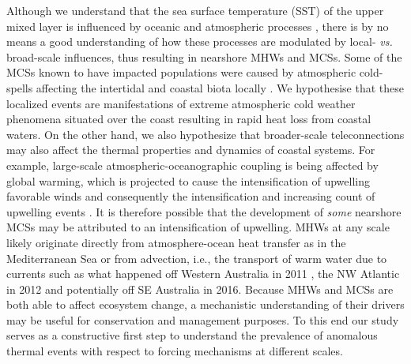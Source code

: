 \documentclass[a4paper,10pt,review]{elsarticle}
\begin{document}
Although we understand that the sea surface temperature (SST) of the upper mixed layer is influenced by oceanic and atmospheric processes \citep[see Equation 1 of][]{Deser2010}, there is by no means a good understanding of how these processes are modulated by local- \emph{vs.} broad-scale influences, thus resulting in nearshore MHWs and MCSs. Some of the MCSs known to have impacted populations were caused by atmospheric cold-spells affecting the intertidal and coastal biota locally \citep{Gunter1941, Firth2011}. We hypothesise that these localized events are manifestations of extreme atmospheric cold weather phenomena situated over the coast resulting in rapid heat loss from coastal waters. On the other hand, we also hypothesize that broader-scale teleconnections may also affect the thermal properties and dynamics of coastal systems. For example, large-scale atmospheric-oceanographic coupling is being affected by global warming, which is projected to cause the intensification of upwelling favorable winds and consequently the intensification and increasing count of upwelling events \citep[see][for a review of this and alternative hypotheses]{Garcia-Reyes2015}. It is therefore possible that the development of \emph{some} nearshore MCSs may be attributed to an intensification of upwelling. MHWs at any scale likely originate directly from atmosphere-ocean heat transfer as in the Mediterranean Sea \citep[e.g.][]{Garrabou2009} or from advection, i.e., the transport of warm water due to currents such as what happened off Western Australia in 2011 \citep{Feng2013, Benthuysen2014}, the NW Atlantic in 2012 \citep{Mills2012, Chen2014, Chen2015} and potentially off SE Australia in 2016. Because MHWs and MCSs are both able to affect ecosystem change, a mechanistic understanding of their drivers may be useful for conservation and management purposes. To this end our study serves as a constructive first step to understand the prevalence of anomalous thermal events with respect to forcing mechanisms at different scales.
\end{document}
